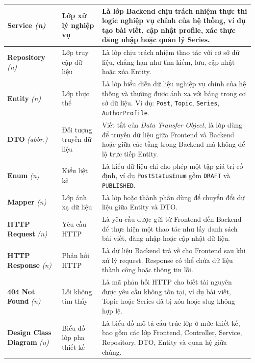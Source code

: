 \documentclass[a4paper,12pt]{article}
\begin{document}
\begin{longtable}{|p{3.5cm}|p{3.5cm}|p{8cm}|}
\textbf{Service} \textit{(n)} & Lớp xử lý nghiệp vụ & Là lớp Backend chịu trách nhiệm thực thi logic nghiệp vụ chính của hệ thống, ví dụ tạo bài viết, cập nhật profile, xác thực đăng nhập hoặc quản lý Series. \\
\hline

\textbf{Repository} \textit{(n)} & Lớp truy cập dữ liệu & Là lớp chịu trách nhiệm thao tác với cơ sở dữ liệu, chẳng hạn như tìm kiếm, lưu, cập nhật hoặc xóa Entity. \\
\hline

\textbf{Entity} \textit{(n)} & Lớp thực thể & Là lớp biểu diễn dữ liệu nghiệp vụ chính của hệ thống và thường được ánh xạ với bảng trong cơ sở dữ liệu. Ví dụ: \texttt{Post}, \texttt{Topic}, \texttt{Series}, \texttt{AuthorProfile}. \\
\hline

\textbf{DTO} \textit{(abbr.)} & Đối tượng truyền dữ liệu & Viết tắt của \textit{Data Transfer Object}, là lớp dùng để truyền dữ liệu giữa Frontend và Backend hoặc giữa các tầng trong Backend mà không để lộ trực tiếp Entity. \\
\hline

\textbf{Enum} \textit{(n)} & Kiểu liệt kê & Là kiểu dữ liệu chỉ cho phép một tập giá trị cố định, ví dụ \texttt{PostStatusEnum} gồm \texttt{DRAFT} và \texttt{PUBLISHED}. \\
\hline

\textbf{Mapper} \textit{(n)} & Lớp ánh xạ dữ liệu & Là lớp hoặc thành phần dùng để chuyển đổi dữ liệu giữa Entity và DTO. \\
\hline

\textbf{HTTP Request} \textit{(n)} & Yêu cầu HTTP & Là yêu cầu được gửi từ Frontend đến Backend để thực hiện một thao tác như lấy danh sách bài viết, đăng nhập hoặc cập nhật dữ liệu. \\
\hline

\textbf{HTTP Response} \textit{(n)} & Phản hồi HTTP & Là dữ liệu Backend trả về cho Frontend sau khi xử lý request. Response có thể chứa dữ liệu thành công hoặc thông tin lỗi. \\
\hline

\textbf{404 Not Found} \textit{(n)} & Lỗi không tìm thấy & Là mã phản hồi HTTP cho biết tài nguyên được yêu cầu không tồn tại, ví dụ bài viết, Topic hoặc Series đã bị xóa hoặc slug không hợp lệ. \\
\hline

\textbf{Design Class Diagram} \textit{(n)} & Biểu đồ lớp pha thiết kế & Là biểu đồ mô tả cấu trúc lớp ở mức thiết kế, bao gồm các lớp Frontend, Controller, Service, Repository, DTO, Entity và quan hệ giữa chúng. \\
\hline


\end{longtable}
\end{document}
